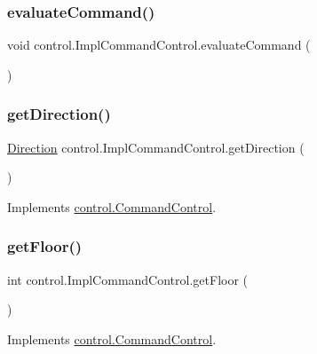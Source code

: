 \subsubsection{\texorpdfstring{evaluateCommand()}{evaluateCommand()}}
{\footnotesize\ttfamily void control.\+Impl\+Command\+Control.\+evaluate\+Command (\begin{DoxyParamCaption}{ }\end{DoxyParamCaption})\hspace{0.3cm}{\ttfamily [private]}}

\mbox{\label{classcontrol_1_1_impl_command_control_a9734880304099b72e4a65dbfe6a510a1}} 
\subsubsection{\texorpdfstring{getDirection()}{getDirection()}}
{\footnotesize\ttfamily \mbox{\hyperlink{enumcontrol_1_1command_1_1_direction}{Direction}} control.\+Impl\+Command\+Control.\+get\+Direction (\begin{DoxyParamCaption}{ }\end{DoxyParamCaption})}



Implements \mbox{\hyperlink{interfacecontrol_1_1_command_control_af668873aadd297c71867fa707b5ecd55}{control.\+Command\+Control}}.

\mbox{\label{classcontrol_1_1_impl_command_control_a03e231769f2023d9f381980a34057ad6}} 
\subsubsection{\texorpdfstring{getFloor()}{getFloor()}}
{\footnotesize\ttfamily int control.\+Impl\+Command\+Control.\+get\+Floor (\begin{DoxyParamCaption}{ }\end{DoxyParamCaption})}



Implements \mbox{\hyperlink{interfacecontrol_1_1_command_control_abfefcf986aceb87768275e04df3653f5}{control.\+Command\+Control}}.

